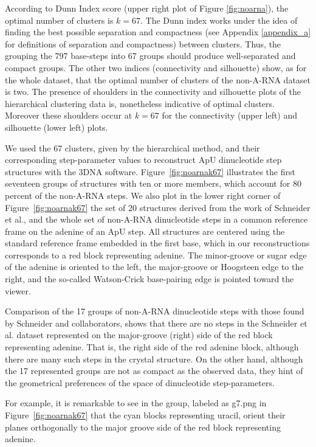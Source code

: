 According   to  Dunn  Index   score  (upper   right  plot   of  Figure
\ref{fig:noarna}), the optimal number  of clusters is $k=67$. The Dunn
index works under the idea of finding the best possible separation and
compactness   (see  Appendix   \ref{appendix_a}  for   definitions  of
separation and  compactness) between  clusters. Thus, the  grouping the
797  base-steps  into  67  groups should  produce  well-separated  and
compact groups.   The other two indices  (connectivity and silhouette)
show, as for the whole dataset, that the optimal number of clusters of
the  non-A-RNA dataset  is  two.   The presence  of  shoulders in  the
connectivity and silhouette plots  of the hierarchical clustering data
is,  nonetheless  indicative   of  optimal  clusters.  Moreover  these
shoulders  occur  at $k=67$  for  the  connectivity  (upper left)  and
silhouette (lower left) plots.

We used the  67 clusters, given by the  hierarchical method, and their
corresponding  step-parameter values  to reconstruct  ApU dinucleotide
step  structures with  the 3DNA  software.  Figure~\ref{fig:noarnak67}
illustrates the first seventeen groups  of structures with ten or more
members, which account for 80 percent of the non-A-RNA steps.  We also
plot in  the lower right corner of  Figure~\ref{fig:noarnak67} the set
of   20   structures  derived   from   the   work   of  Schneider   et
al.\cite{schneider2004}, and  the whole set  of non-A-RNA dinucleotide
steps in a common reference frame  on the adenine of an ApU step.  All
structures are centered using the standard reference frame embedded in
the  first base,  which in  our reconstructions  corresponds to  a red
block  representing adenine.  The minor-groove  or sugar  edge  of the
adenine is oriented to the left, the major-groove or Hoogsteen edge to
the right, and the so-called Watson-Crick base-pairing edge is pointed
toward the viewer.

Comparison of the 17 groups of non-A-RNA dinucleotide steps with those
found by Schneider and collaborators, shows that there are no steps in
the Schneider  et al. dataset represented on  the major-groove (right)
side of the red block representing adenine. That is, the right side of
the  red adenine  block, although  there are  many such  steps  in the
crystal  structure. On  the other  hand, although  the  17 represented
groups  are not  as compact  as the  observed data,  they hint  of the
geometrical preferences of the space of dinucleotide step-parameters.

For example, it  is remarkable to see in the  group, labeled as g7.png
in  Figure~\ref{fig:noarnak67}  that   the  cyan  blocks  representing
uracil, orient their  planes orthogonally to the major  groove side of
the red block representing adenine.

